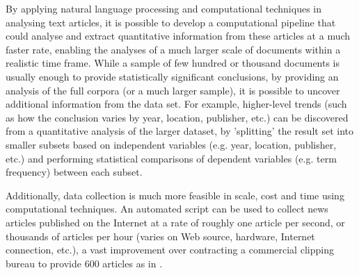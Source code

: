 \documentclass{report}
\begin{document}
By applying natural language processing and computational techniques in analysing text articles, it is possible to develop a computational pipeline that could analyse and extract quantitative information from these articles at a much faster rate, enabling the analyses of a much larger scale of documents within a realistic time frame.
While a sample of few hundred or thousand documents is usually enough to provide statistically significant conclusions, by providing an analysis of the full corpora (or a much larger sample), it is possible to uncover additional information from the data set.
For example, higher-level trends (such as how the conclusion varies by year, location, publisher, etc.) can be discovered from a quantitative analysis of the larger dataset, by 'splitting' the result set into smaller subsets based on independent variables (e.g. year, location, publisher, etc.) and performing statistical comparisons of dependent variables (e.g. term frequency) between each subset.

Additionally, data collection is much more feasible in scale, cost and time using computational techniques. 
An automated script can be used to collect news articles published on the Internet at a rate of roughly one article per second, or thousands of articles per hour (varies on Web source, hardware, Internet connection, etc.), a vast improvement over contracting a commercial clipping bureau to provide 600 articles as in \cite{coverdale2002depictions}.
\end{document}
